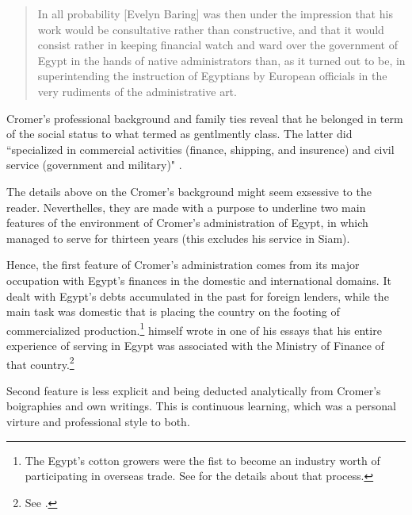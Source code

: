 \begin{quote}
In all probability [Evelyn Baring] was then under the impression that his work would be consultative rather than constructive, and that it would consist rather in keeping financial watch and ward over the government of Egypt in the hands of native administrators than, as it turned out to be, in superintending the instruction of Egyptians by European officials in the very rudiments of the administrative art. \citep[pp.~213-214]{traill1897}
\end{quote}

Cromer's professional background and family ties reveal that he belonged in term of the social status to what \cite{queralt2022} termed as gentlmently class. The latter did ``specialized in commercial activities (finance, shipping, and insurence) and civil service (government and military)" \citep[p.~99]{queralt2022}.

The details above on the Cromer's background might seem exsessive to the reader. Neverthelles, they are made with a purpose to underline two main features of the environment of Cromer's administration of Egypt, in which \citeauthor{innes1913} managed to serve for thirteen years (this excludes his service in Siam). 

Hence, the first feature of Cromer's administration comes from its major occupation with Egypt's finances in the domestic and international domains. It dealt with Egypt's debts accumulated in the past for foreign lenders, while the main task was domestic that is placing the country on the footing of commercialized production.\footnote{The Egypt's cotton growers were the fist to become an industry worth of participating in overseas trade. See \cite{primel2016} for the details about that process.} \citeauthor{innes1913} himself wrote in one of his essays that his entire experience of serving in Egypt was associated with the Ministry of Finance of that country.\footnote{See \citep[p.~3]{innes1907}.} 

Second feature is less explicit and being deducted analytically from Cromer's boigraphies and \citeauthor{innes1913} own writings. This is continuous learning, which was a personal virture and professional style to both. 


